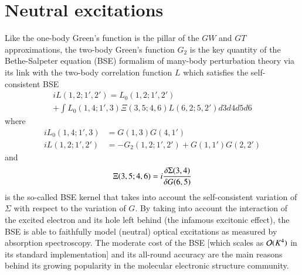 \documentclass[aip,jcp,reprint,noshowkeys,superscriptaddress]{revtex4-1}
\begin{document}
\section{Neutral excitations}
\label{sec:neutral}
Like the one-body Green's function is the pillar of the $GW$ and $GT$ approximations, the two-body Green's function $G_2$ is the key quantity of the Bethe-Salpeter equation (BSE) formalism of many-body perturbation theory \cite{Salpeter_1951,Strinati_1988,Blase_2018,Blase_2020} via its link with the two-body correlation function $L$ which satisfies the self-consistent BSE 
\begin{multline}
	 iL(1,2;1',2') = L_0(1,2;1',2') 
	 \\
	 + \int L_0(1,4;1',3) \Xi(3,5;4,6) L(6,2;5,2') d3d4d5d6
\end{multline}
where
\begin{subequations}
\begin{align}
\label{eq:L0}
	 iL_0(1,4;1',3) & = G(1,3) G(4,1')
	 \\
\label{eq:L}
	 iL(1,2;1',2') & = -G_2(1,2;1',2') + G(1,1')G(2,2')
\end{align}
\end{subequations}
and 
\begin{equation}
\label{eq:Xi}
	\Xi(3,5;4,6) = i \fdv{\Sigma(3,4)}{G(6,5)}
\end{equation}
is the so-called BSE kernel that takes into account the self-consistent variation of $\Sigma$ with respect to the variation of $G$.
By taking into account the interaction of the excited electron and its hole left behind (the infamous excitonic effect), the BSE is able to faithfully model (neutral) optical excitations as measured by absorption spectroscopy. 
The moderate cost of the BSE [which scales as $\order*{K^4}$ in its standard implementation] and its all-round accuracy are the main reasons behind its growing popularity in the molecular electronic structure community. \cite{Rohlfing_1999a,Horst_1999,Puschnig_2002,Tiago_2003,Boulanger_2014,Jacquemin_2015a,Bruneval_2015,Jacquemin_2015b,Hirose_2015,Jacquemin_2017a,Jacquemin_2017b,Rangel_2017,Krause_2017,Gui_2018,Blase_2018,Liu_2020,Blase_2020,Holzer_2018a,Holzer_2018b,Loos_2020e,Loos_2021}
\end{document}
